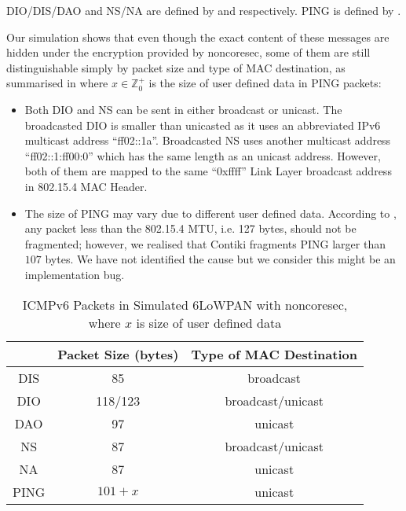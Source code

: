 DIO/DIS/DAO and NS/NA are defined by \cite{rfc6550} and \cite{rfc6775} respectively. PING is defined by \cite{rfc2463}.

Our simulation shows that even though the exact content of these messages are hidden under the encryption provided by noncoresec, some of them are still distinguishable simply by packet size and type of MAC destination, as summarised in  where $x \in \mathbb{Z}_{0}^{+}$ is the size of user defined data in PING packets:

\begin{itemize}
	\item Both DIO and NS can be sent in either broadcast or unicast. The broadcasted DIO is smaller than unicasted as it uses an abbreviated IPv6 multicast address ``ff02::1a''. Broadcasted NS uses another multicast address ``ff02::1:ff00:0'' which has the same length as an unicast address. However, both of them are mapped to the same ``0xffff'' Link Layer broadcast address in 802.15.4 MAC Header.
	\item The size of PING may vary due to different user defined data. According to \cite{rfc4944}, any packet less than the 802.15.4 MTU, i.e. 127 bytes, should not be fragmented; however, we realised that Contiki fragments PING larger than $107$ bytes. We have not identified the cause but we consider this might be an implementation bug.
\end{itemize}

\begin{table}[ht!]
	\center
	{
		\begin{tabular}{|c|c|c|}
			\hline
			       & Packet Size (bytes) & Type of MAC Destination \\ \hline
			DIS    & 85                  & broadcast                       \\ \hline
			DIO  & 118/123                 & broadcast/unicast                       \\ \hline
			DAO    & 97                  & unicast                      \\ \hline
			NS & 87                  & broadcast/unicast                       \\ \hline
			NA     & 87                  & unicast                      \\ \hline
			PING   & $101+x$               & unicast                      \\ \hline
		\end{tabular}
	}
	\caption{ICMPv6 Packets in Simulated 6LoWPAN with noncoresec, where $x$ is size of user defined data}
	\label{ICMPPacketFeature}
\end{table}

